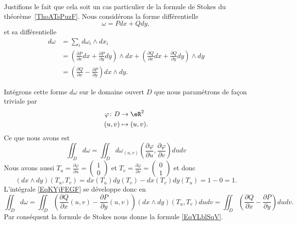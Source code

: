 Justifions le fait que cela soit un cas particulier de la formule de Stokes du théorème~\ref{ThoATsPuzF}. Nous considérons la forme différentielle
\begin{equation}
	\omega=Pdx+Qdy,
\end{equation}
et sa différentielle
\begin{subequations}
	\begin{align}
		d\omega & =\sum_id\omega_i\wedge dx_i                                                                                                                                                                      \\
		        & =\left( \frac{ \partial P }{ \partial x }dx+\frac{ \partial P }{ \partial y }dy \right)\wedge dx+\left( \frac{ \partial Q }{ \partial x }dx+\frac{ \partial Q }{ \partial y }dy \right)\wedge dy \\
		        & =\left( \frac{ \partial Q }{ \partial x }-\frac{ \partial P }{ \partial y } \right)dx\wedge dy.
	\end{align}
\end{subequations}

Intégrons cette forme \( d\omega\) sur le domaine ouvert \( D\) que nous paramétrons de façon triviale par
\begin{equation}
	\begin{aligned}
		\varphi\colon D & \to \eR^2      \\
		(u,v)           & \mapsto (u,v).
	\end{aligned}
\end{equation}
Ce que nous avons est
\begin{equation}\label{EqKYjFEGF}
	\iint_D d\omega=\iint_D d\omega_{(u,v)}\left( \frac{ \partial \varphi }{ \partial u },\frac{ \partial \varphi }{ \partial v } \right)dudv
\end{equation}
Nous avons aussi \( T_u=\frac{ \partial \varphi }{ \partial u }=\begin{pmatrix}
	1 \\
	0
\end{pmatrix}\) et \(T_v= \frac{ \partial \varphi }{ \partial v }=\begin{pmatrix}
	0 \\
	1
\end{pmatrix}\) et donc
\begin{equation}
	(dx\wedge dy)(T_u,T_v)=dx(T_u)dy(T_v)-dx(T_v)dy(T_u)=1-0=1.
\end{equation}
L'intégrale \eqref{EqKYjFEGF} se développe donc en
\begin{equation}
	\iint_Dd\omega=\iint_D\left( \frac{ \partial Q }{ \partial x }(u,v)-\frac{ \partial P }{ \partial y }(u,v) \right)(dx\wedge dy)(T_u,T_v)dudv=\iint_D\left( \frac{ \partial Q }{ \partial x }-\frac{ \partial P }{ \partial y } \right)dudv.
\end{equation}
Par conséquent la formule de Stokes nous donne la formule \eqref{EqYLblSqV}.

